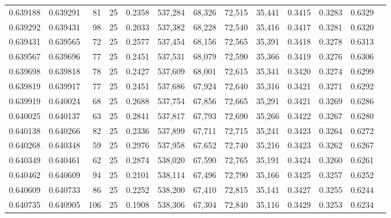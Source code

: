 \begin{tabular}{rrrrrrrrrrrrr}
0.639188 & 0.639291 &    81 &  25 &                                     0.2358 & 537,284 &  68,326 &  72,515 &  35,441 & 0.3415 & 0.3283 & 0.6329 \\
0.639292 & 0.639431 &    98 &  25 &                                     0.2033 & 537,382 &  68,228 &  72,540 &  35,416 & 0.3417 & 0.3281 & 0.6320 \\
0.639431 & 0.639565 &    72 &  25 &                                     0.2577 & 537,454 &  68,156 &  72,565 &  35,391 & 0.3418 & 0.3278 & 0.6313 \\
0.639567 & 0.639696 &    77 &  25 &                                     0.2451 & 537,531 &  68,079 &  72,590 &  35,366 & 0.3419 & 0.3276 & 0.6306 \\
0.639698 & 0.639818 &    78 &  25 &                                     0.2427 & 537,609 &  68,001 &  72,615 &  35,341 & 0.3420 & 0.3274 & 0.6299 \\
0.639819 & 0.639917 &    77 &  25 &                                     0.2451 & 537,686 &  67,924 &  72,640 &  35,316 & 0.3421 & 0.3271 & 0.6292 \\
0.639919 & 0.640024 &    68 &  25 &                                     0.2688 & 537,754 &  67,856 &  72,665 &  35,291 & 0.3421 & 0.3269 & 0.6286 \\
0.640025 & 0.640137 &    63 &  25 &                                     0.2841 & 537,817 &  67,793 &  72,690 &  35,266 & 0.3422 & 0.3267 & 0.6280 \\
0.640138 & 0.640266 &    82 &  25 &                                     0.2336 & 537,899 &  67,711 &  72,715 &  35,241 & 0.3423 & 0.3264 & 0.6272 \\
0.640268 & 0.640348 &    59 &  25 &                                     0.2976 & 537,958 &  67,652 &  72,740 &  35,216 & 0.3423 & 0.3262 & 0.6267 \\
0.640349 & 0.640461 &    62 &  25 &                                     0.2874 & 538,020 &  67,590 &  72,765 &  35,191 & 0.3424 & 0.3260 & 0.6261 \\
0.640462 & 0.640609 &    94 &  25 &                                     0.2101 & 538,114 &  67,496 &  72,790 &  35,166 & 0.3425 & 0.3257 & 0.6252 \\
0.640609 & 0.640733 &    86 &  25 &                                     0.2252 & 538,200 &  67,410 &  72,815 &  35,141 & 0.3427 & 0.3255 & 0.6244 \\
0.640735 & 0.640905 &   106 &  25 &                                     0.1908 & 538,306 &  67,304 &  72,840 &  35,116 & 0.3429 & 0.3253 & 0.6234 \\

\end{tabular}
